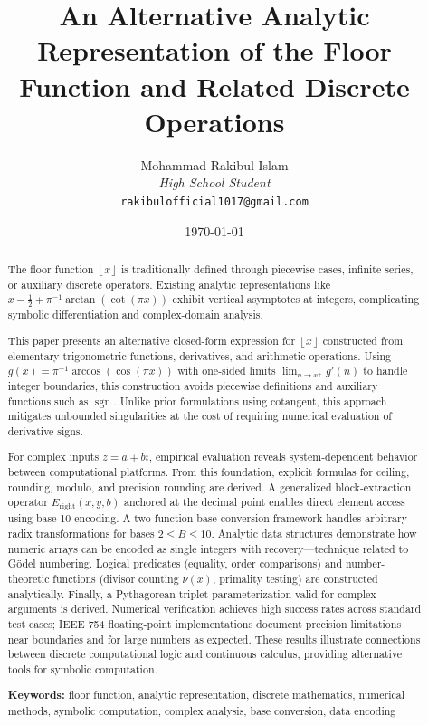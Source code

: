\documentclass[12pt, a4paper]{article}
\title{\textbf{An Alternative Analytic Representation of the Floor Function and Related Discrete Operations}}
\author{Mohammad Rakibul Islam \\ \textit{High School Student} \\ \texttt{rakibulofficial1017@gmail.com}}
\date{\today}
\theoremstyle{note}
\newcommand{\floor}[1]{\left\lfloor #1 \right\rfloor}
\begin{document}
\maketitle

\begin{abstract}
The floor function $\floor{x}$ is traditionally defined through piecewise cases, infinite series, or auxiliary discrete operators. Existing analytic representations like $x - \frac{1}{2} + \pi^{-1}\arctan(\cot(\pi x))$ exhibit vertical asymptotes at integers, complicating symbolic differentiation and complex-domain analysis.

This paper presents an alternative closed-form expression for $\floor{x}$ constructed from elementary trigonometric functions, derivatives, and arithmetic operations. Using $g(x) = \pi^{-1}\arccos(\cos(\pi x))$ with one-sided limits $\lim_{n \to x^+} g'(n)$ to handle integer boundaries, this construction avoids piecewise definitions and auxiliary functions such as $\operatorname{sgn}$. Unlike prior formulations using cotangent, this approach mitigates unbounded singularities at the cost of requiring numerical evaluation of derivative signs.

For complex inputs $z = a + bi$, empirical evaluation reveals system-dependent behavior between computational platforms. From this foundation, explicit formulas for ceiling, rounding, modulo, and precision rounding are derived. A generalized block-extraction operator $E_{\text{right}}(x, y, b)$ anchored at the decimal point enables direct element access using base-10 encoding. A two-function base conversion framework handles arbitrary radix transformations for bases $2 \leq B \leq 10$. Analytic data structures demonstrate how numeric arrays can be encoded as single integers with recovery—technique related to Gödel numbering. Logical predicates (equality, order comparisons) and number-theoretic functions (divisor counting $\nu(x)$, primality testing) are constructed analytically. Finally, a Pythagorean triplet parameterization valid for complex arguments is derived. Numerical verification achieves high success rates across standard test cases; IEEE 754 floating-point implementations document precision limitations near boundaries and for large numbers as expected. These results illustrate connections between discrete computational logic and continuous calculus, providing alternative tools for symbolic computation.

\noindent\textbf{Keywords:} floor function, analytic representation, discrete mathematics, numerical methods, symbolic computation, complex analysis, base conversion, data encoding

\end{abstract}
\end{document}
